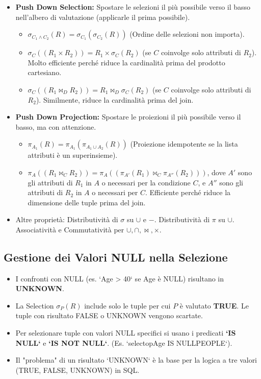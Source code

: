 \documentclass{article}
\newcommand{\union}{\cup}
\newcommand{\intersection}{\cap}
\newcommand{\selectop}[2]{\sigma_{#1}(#2)} %
\newcommand{\project}[2]{\pi_{#1}(#2)} %
\newcommand{\cartesian}{\times}
\newcommand{\naturaljoin}{\Join}
\newcommand{\landop}{\wedge}
\begin{document}
	\begin{itemize}
		\item \textbf{Push Down Selection:} Spostare le selezioni il più possibile verso il basso nell'albero di valutazione (applicarle il prima possibile).
		\begin{itemize}
			\item $\selectop{C_1 \landop C_2}{R} = \selectop{C_1}{\selectop{C_2}{R}}$ (Ordine delle selezioni non importa).
			\item $\selectop{C}{(R_1 \cartesian R_2)} = R_1 \cartesian \selectop{C}{R_2}$ (se $C$ coinvolge solo attributi di $R_2$). Molto efficiente perché riduce la cardinalità prima del prodotto cartesiano.
			\item $\selectop{C}{(R_1 \naturaljoin_D R_2)} = R_1 \naturaljoin_D \selectop{C}{R_2}$ (se $C$ coinvolge solo attributi di $R_2$). Similmente, riduce la cardinalità prima del join.
		\end{itemize}
		\item \textbf{Push Down Projection:} Spostare le proiezioni il più possibile verso il basso, ma con attenzione.
		\begin{itemize}
			\item $\project{A_1}{R} = \project{A_1}{\project{A_1 \cup A_2}{R}}$ (Proiezione idempotente se la lista attributi è un superinsieme).
			\item $\project{A}{(R_1 \naturaljoin_C R_2)} = \project{A}{(\project{A'}{R_1} \naturaljoin_C \project{A''}{R_2})}$, dove $A'$ sono gli attributi di $R_1$ in $A$ o necessari per la condizione $C$, e $A''$ sono gli attributi di $R_2$ in $A$ o necessari per $C$. Efficiente perché riduce la dimensione delle tuple prima del join.
		\end{itemize}
		\item Altre proprietà: Distributività di $\sigma$ su $\union$ e $-$. Distributività di $\pi$ su $\union$. Associatività e Commutatività per $\union, \intersection, \naturaljoin, \cartesian$.
	\end{itemize}
	
	\subsection{Gestione dei Valori NULL nella Selezione}
	\begin{itemize}
		\item I confronti con NULL (es. `Age > 40` se Age è NULL) risultano in \textbf{UNKNOWN}.
		\item La Selection $\selectop{P}{R}$ include solo le tuple per cui $P$ è valutato \textbf{TRUE}. Le tuple con risultato FALSE o UNKNOWN vengono scartate.
		\item Per selezionare tuple con valori NULL specifici si usano i predicati \textbf{`IS NULL`} e \textbf{`IS NOT NULL`}. (Es. `selectop{Age IS NULL}{PEOPLE}`).
		\item Il "problema" di un risultato `UNKNOWN` è la base per la logica a tre valori (TRUE, FALSE, UNKNOWN) in SQL.
	\end{itemize}
	
\end{document}
